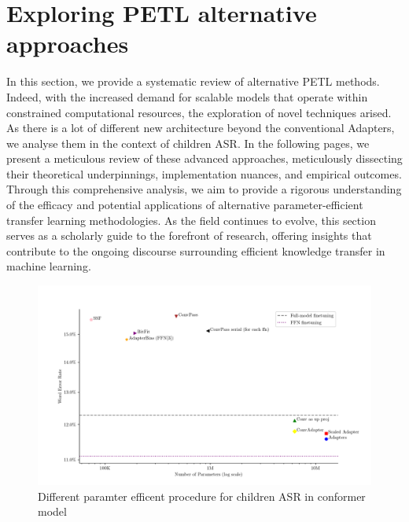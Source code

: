 \section{Exploring PETL alternative approaches}
In this section, we provide a systematic review of alternative PETL methods. Indeed, with the increased demand for scalable models that operate within constrained computational resources, the exploration of novel techniques arised. As there is a lot of different new architecture beyond the conventional Adapters, we analyse them in the context of children ASR. In the following pages, we present a meticulous review of these advanced approaches, meticulously dissecting their theoretical underpinnings, implementation nuances, and empirical outcomes. Through this comprehensive analysis, we aim to provide a rigorous understanding of the efficacy and potential applications of alternative parameter-efficient transfer learning methodologies.  As the field continues to evolve, this section serves as a scholarly guide to the forefront of research, offering insights that contribute to the ongoing discourse surrounding efficient knowledge transfer in machine learning.

\begin{figure}
    \begin{center}
        \includegraphics[width=\textwidth]{imgs/Adapter_compare_withoutWide.png}
        \caption{Different paramter efficent procedure for children ASR in conformer model}
        \label{fig:adapter_compared_withoutWide}
    \end{center}
\end{figure}
